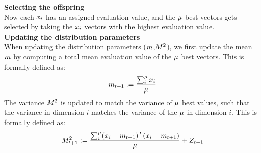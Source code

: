 \textbf{Selecting the offspring}\\
Now each $x_{i}$ has an assigned evaluation value, and the $\mu$ best vectors gets selected by taking the $x_{i}$ vectors with the highest evaluation value.
\\

\textbf{Updating the distribution parameters}\\
When updating the distribution parameters ($m$,$M^2$), we first update
the mean $m$ by computing a total mean evaluation value of the $\mu$ best vectors. This is formally defined as:
\begin{align*}
m_{t +1}:=\frac{\sum_{i}^{\mu} x_{i}}{\mu}
\end{align*}
The variance $M^2$ is updated to match the variance of $\mu$ best
values, such that the variance in dimension $i$ matches the variance of the $\mu$
in dimension $i$.
This is formally defined as:
\begin{align*}
M^2_{t +1}:=\frac{\sum_{i}^{\mu}
(x_{i} - m_{t +1})^T(x_{i} - m_{t +1})}{\mu} + Z_{t + 1}
\end{align*}
\\
